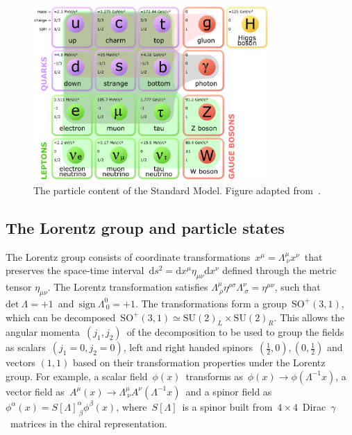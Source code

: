 \begin{figure}
\begin{centering}
\includegraphics[width=0.8\textwidth]{figures/theory/Standard_Model_of_Elementary_Particles_modified_version.eps}
\caption[The particle content of the Standard Model]{The particle content of the Standard Model. Figure adapted from~\cite{wikipediaSM}.}
\label{fig:standard_model}
\end{centering}
\end{figure}


\subsection{The Lorentz group and particle states}

The Lorentz group consists of coordinate transformations~$x^\mu = \Lambda^{\mu}_{\ \nu} x^\nu$~that preserves the space-time interval~$\mathrm{d}s^2 = \mathrm{d}x^\mu \eta_{\mu\nu} \mathrm{d}x^\nu$ defined through the metric tensor $\eta_{\mu\nu}$. The Lorentz transformation satisfies $\Lambda^{\mu}_{\ \rho} \eta^{\rho\sigma} \Lambda^{\nu}_{\ \sigma} = \eta^{\mu\nu}$, such that~$\mathrm{det}\ \Lambda = +1$~and~$\mathrm{sign}\ \Lambda^0_{\ 0} = +1$. The transformations form a group~$\mathrm{SO}^+(3,1)$, which can be decomposed~$\mathrm{SO}^+(3,1) \simeq \mathrm{SU}(2)_L \times \mathrm{SU}(2)_R$. This allows the angular momenta~$(j_1, j_2)$~of the decomposition to be used to group the fields as scalars~$(j_1=0, j_2=0)$, left and right handed spinors~$(\frac{1}{2}, 0), (0, \frac{1}{2})$ and vectors $(1, 1)$ based on their transformation properties under the Lorentz group. For example, a scalar field~$\phi(x)$~transforms as~$\phi(x) \rightarrow \phi(\Lambda^{-1} x)$, a vector field as~$A^\mu(x) \rightarrow \Lambda^\mu_{\ \nu} A^\nu(\Lambda^{-1}x)$~and a spinor field as~$\phi^\alpha(x) = S[\Lambda]^\alpha_{\ \beta} \phi^\beta(x)$, where~$S[\Lambda]$~is a spinor built from~$4\times4$~Dirac~$\gamma$~matrices in the chiral representation.

